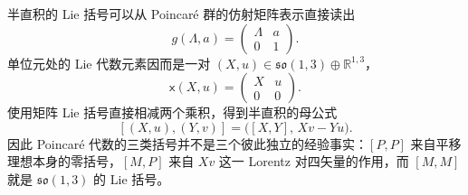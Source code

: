 半直积的 Lie 括号可以从 Poincar\'e 群的仿射矩阵表示直接读出
\begin{equation}
 \boxed{
 g(\Lambda,a)=
 \begin{pmatrix}
 \Lambda & a\\
 0&1
 \end{pmatrix}.}
 \label{eq:poincare-affine-matrix-dp75}
\end{equation}
单位元处的 Lie 代数元素因而是一对 $(X,u)\in\mathfrak{so}(1,3)\oplus\mathbb R^{1,3}$，
\begin{equation*}
 \mathsf x(X,u)=
 \begin{pmatrix}
 X&u\\
 0&0
 \end{pmatrix}.
\end{equation*}
使用矩阵 Lie 括号直接相减两个乘积，得到半直积的母公式
\begin{equation}
 \boxed{
 [(X,u),(Y,v)]
 =\bigl([X,Y],\,Xv-Yu\bigr).}
 \label{eq:poincare-semidir-lie-bracket-dp75}
\end{equation}
因此 Poincar\'e 代数的三类括号并不是三个彼此独立的经验事实：$[P,P]$ 来自平移理想本身的零括号，$[M,P]$ 来自 $Xv$ 这一 Lorentz 对四矢量的作用，而 $[M,M]$ 就是 $\mathfrak{so}(1,3)$ 的 Lie 括号。


